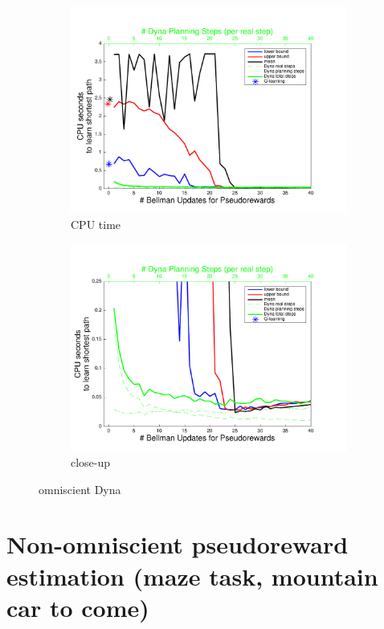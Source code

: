 \documentclass[letterpaper]{article}
\begin{document}
\begin{figure}
\centering
\begin{subfigure}{.4\textwidth}
  \centering
  \includegraphics[width=.95\linewidth]{cpus_vs_PRiterations_omniscientDYNA_toGoal}
  \caption{CPU time}
\end{subfigure}
\begin{subfigure}{.4\textwidth}
  \centering
  \includegraphics[width=.95\linewidth]{cpus_vs_PRiterations_omniscientDYNA_toGoal_closeup}
  \caption{close-up}
\end{subfigure}
\caption{omniscient Dyna}
\label{fig:S1b}
\end{figure}

\pagebreak

\section{Non-omniscient pseudoreward estimation (maze task, mountain car to come)}
\end{document}

